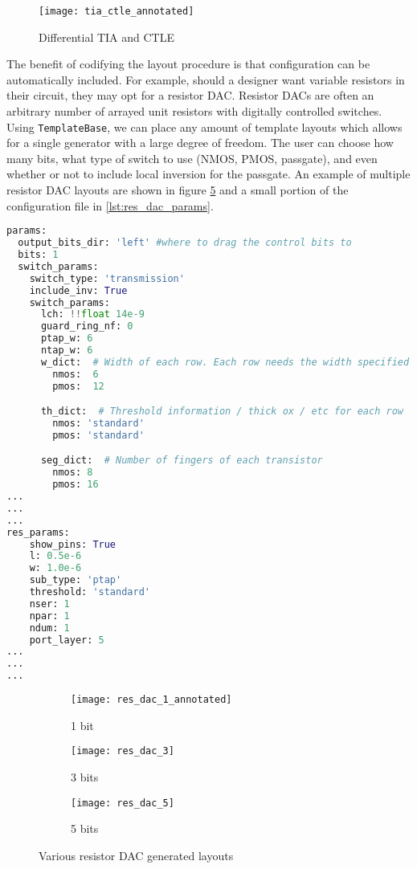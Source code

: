 \begin{figure}[h]
\centering
\texttt{[image: tia\_ctle\_annotated]}
\caption{Differential TIA and CTLE}
\label{fig:tia_ctle}
\end{figure}
The benefit of codifying the layout procedure is that configuration can be automatically included. For example, should a designer want variable resistors in their circuit, they may opt for a resistor DAC. Resistor DACs are often an arbitrary number of arrayed unit resistors with digitally controlled switches. Using \texttt{TemplateBase}, we can place any amount of template layouts which allows for a single generator with a large degree of freedom. The user can choose how many bits, what type of switch to use (NMOS, PMOS, passgate), and even whether or not to include local inversion for the passgate. An example of multiple resistor DAC layouts are shown in figure \ref{fig:dac} and a small portion of the configuration file in \ref{lst:res_dac_params}.
\begin{lstlisting}[language=Python, caption=Resistor DAC params sample, label={lst:res_dac_params}, float]
params:
  output_bits_dir: 'left' #where to drag the control bits to
  bits: 1
  switch_params:
    switch_type: 'transmission'
    include_inv: True
    switch_params:
      lch: !!float 14e-9
      guard_ring_nf: 0
      ptap_w: 6
      ntap_w: 6
      w_dict:  # Width of each row. Each row needs the width specified
        nmos:  6
        pmos:  12

      th_dict:  # Threshold information / thick ox / etc for each row
        nmos: 'standard'
        pmos: 'standard'

      seg_dict:  # Number of fingers of each transistor
        nmos: 8
        pmos: 16
...
...
...
res_params:
    show_pins: True
    l: 0.5e-6
    w: 1.0e-6
    sub_type: 'ptap'
    threshold: 'standard'
    nser: 1
    npar: 1
    ndum: 1
    port_layer: 5
...
...
...
\end{lstlisting}
\clearpage
\begin{figure}[h]
\centering
\begin{subfigure}{1\linewidth}
  \centering
  \texttt{[image: res\_dac\_1\_annotated]}
  \caption{1 bit}
  \label{fig:sfig1}
\end{subfigure}
\begin{subfigure}{.4\linewidth}
  \centering
\texttt{[image: res\_dac\_3]}
  \caption{3 bits}
  \label{fig:sfig2}
\end{subfigure}
\begin{subfigure}{.5\linewidth}
  \centering
\texttt{[image: res\_dac\_5]}
  \caption{5 bits}
  \label{fig:sfig2}
\end{subfigure}
\caption{Various resistor DAC generated layouts}
\label{fig:dac}
\end{figure}
\clearpage
